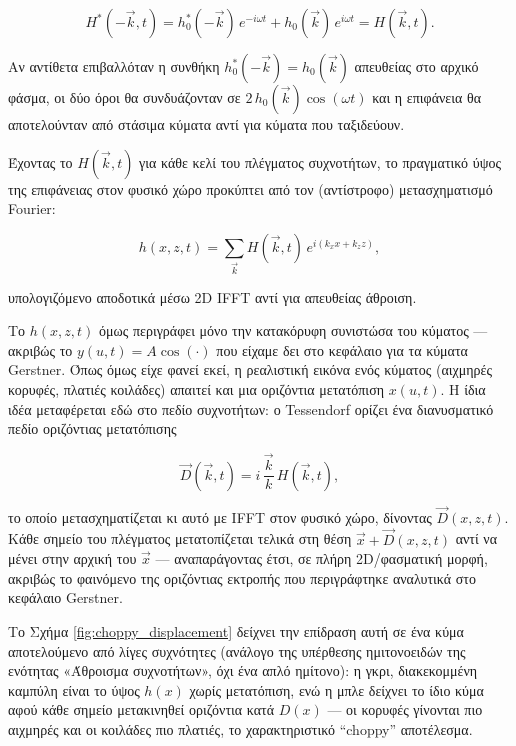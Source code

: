 \documentclass[a4paper, 11pt]{article}
\begin{document}
\[
H^*(-\vec{k},t) = h_0^*(-\vec{k})\,e^{-i\omega t} + h_0(\vec{k})\,e^{i\omega t} = H(\vec{k},t).
\]

Αν αντίθετα επιβαλλόταν η συνθήκη \(h_0^*(-\vec{k}) = h_0(\vec{k})\)
απευθείας στο αρχικό φάσμα, οι δύο όροι θα συνδυάζονταν σε
\(2\,h_0(\vec{k})\cos(\omega t)\) και η επιφάνεια θα αποτελούνταν από
στάσιμα κύματα αντί για κύματα που ταξιδεύουν.

Έχοντας το \(H(\vec{k},t)\) για κάθε κελί του πλέγματος συχνοτήτων, το
πραγματικό ύψος της επιφάνειας στον φυσικό χώρο προκύπτει από τον
(αντίστροφο) μετασχηματισμό Fourier:

\[
h(x,z,t) = \sum_{\vec{k}} H(\vec{k},t)\, e^{i(k_xx+k_zz)},
\]

υπολογιζόμενο αποδοτικά μέσω 2D IFFT αντί για απευθείας άθροιση.

Το \(h(x,z,t)\) όμως περιγράφει μόνο την κατακόρυφη συνιστώσα του
κύματος --- ακριβώς το \(y(u,t)=A\cos(\cdot)\) που είχαμε δει στο
κεφάλαιο για τα κύματα Gerstner. Όπως όμως είχε φανεί εκεί, η ρεαλιστική
εικόνα ενός κύματος (αιχμηρές κορυφές, πλατιές κοιλάδες) απαιτεί και μια
οριζόντια μετατόπιση \(x(u,t)\). Η ίδια ιδέα μεταφέρεται εδώ στο πεδίο
συχνοτήτων: ο Tessendorf ορίζει ένα διανυσματικό πεδίο οριζόντιας
μετατόπισης

\[
\vec{D}(\vec{k},t) = i\,\frac{\vec{k}}{k}\,H(\vec{k},t),
\]

το οποίο μετασχηματίζεται κι αυτό με IFFT στον φυσικό χώρο, δίνοντας
\(\vec D(x,z,t)\). Κάθε σημείο του πλέγματος μετατοπίζεται τελικά στη
θέση \(\vec{x}+\vec{D}(x,z,t)\) αντί να μένει στην αρχική του
\(\vec{x}\) --- αναπαράγοντας έτσι, σε πλήρη 2D/φασματική μορφή, ακριβώς
το φαινόμενο της οριζόντιας εκτροπής που περιγράφτηκε αναλυτικά στο
κεφάλαιο Gerstner.

Το Σχήμα \ref{fig:choppy_displacement} δείχνει την επίδραση αυτή σε ένα
κύμα αποτελούμενο από λίγες συχνότητες (ανάλογο της υπέρθεσης
ημιτονοειδών της ενότητας «Άθροισμα συχνοτήτων», όχι ένα απλό ημίτονο):
η γκρι, διακεκομμένη καμπύλη είναι το ύψος \(h(x)\) χωρίς μετατόπιση,
ενώ η μπλε δείχνει το ίδιο κύμα αφού κάθε σημείο μετακινηθεί οριζόντια
κατά \(D(x)\) --- οι κορυφές γίνονται πιο αιχμηρές και οι κοιλάδες πιο
πλατιές, το χαρακτηριστικό ``choppy'' αποτέλεσμα.
\end{document}
